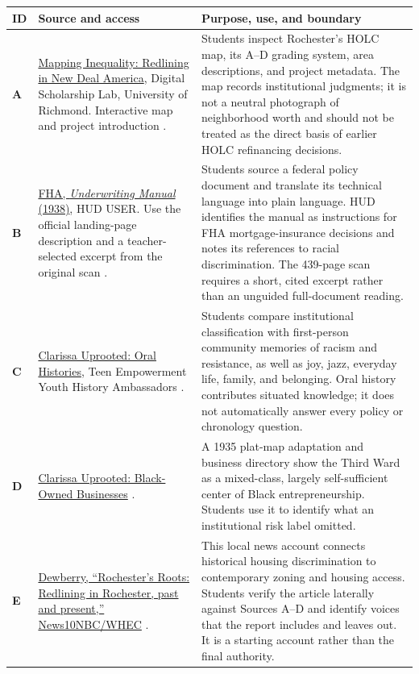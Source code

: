 \documentclass[11pt]{article}
\begin{document}
\renewcommand{\arraystretch}{1.18}
\begin{longtable}{>{\bfseries\RaggedRight\arraybackslash}p{0.28in} >{\RaggedRight\arraybackslash}p{2.02in} >{\RaggedRight\arraybackslash}p{4.20in}}
\toprule
ID & Source and access & Purpose, use, and boundary \\
\midrule
A & \href{https://dsl.richmond.edu/panorama/redlining/introduction}{Mapping Inequality: Redlining in New Deal America}, Digital Scholarship Lab, University of Richmond. Interactive map and project introduction \cite{dslMappingInequality}. & Students inspect Rochester's HOLC map, its A--D grading system, area descriptions, and project metadata. The map records institutional judgments; it is not a neutral photograph of neighborhood worth and should not be treated as the direct basis of earlier HOLC refinancing decisions. \\
\addlinespace
B & \href{https://www.huduser.gov/portal/publications/Federal-Housing-Administration-Underwriting-Manual.html}{FHA, \textit{Underwriting Manual} (1938)}, HUD USER. Use the official landing-page description and a teacher-selected excerpt from the original scan \cite{fha1938}. & Students source a federal policy document and translate its technical language into plain language. HUD identifies the manual as instructions for FHA mortgage-insurance decisions and notes its references to racial discrimination. The 439-page scan requires a short, cited excerpt rather than an unguided full-document reading. \\
\addlinespace
C & \href{https://www.clarissauprooted.org/portfolio-items/oral-histories/}{Clarissa Uprooted: Oral Histories}, Teen Empowerment Youth History Ambassadors \cite{clarissaOralHistories}. & Students compare institutional classification with first-person community memories of racism and resistance, as well as joy, jazz, everyday life, family, and belonging. Oral history contributes situated knowledge; it does not automatically answer every policy or chronology question. \\
\addlinespace
D & \href{https://www.clarissauprooted.org/portfolio-items/black-owned-businesses/}{Clarissa Uprooted: Black-Owned Businesses} \cite{clarissaBusinesses}. & A 1935 plat-map adaptation and business directory show the Third Ward as a mixed-class, largely self-sufficient center of Black entrepreneurship. Students use it to identify what an institutional risk label omitted. \\
\addlinespace
E & \href{https://www.whec.com/top-news/rochesters-roots-redlining-in-rochester-past-and-present/}{Dewberry, ``Rochester's Roots: Redlining in Rochester, past and present,'' News10NBC/WHEC} \cite{dewberry2025}. & This local news account connects historical housing discrimination to contemporary zoning and housing access. Students verify the article laterally against Sources A--D and identify voices that the report includes and leaves out. It is a starting account rather than the final authority. \\
\bottomrule
\end{longtable}
\end{document}
